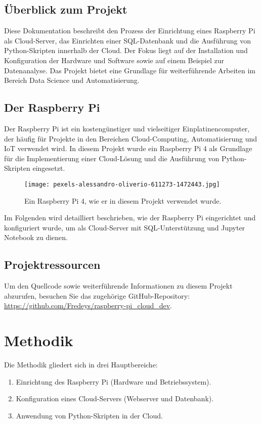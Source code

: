 \documentclass[a4paper,12pt]{article}
\begin{document}
\subsection{Überblick zum Projekt}
Diese Dokumentation beschreibt den Prozess der Einrichtung eines Raspberry Pi als Cloud-Server, das Einrichten einer SQL-Datenbank und die Ausführung von Python-Skripten innerhalb der Cloud. Der Fokus liegt auf der Installation und Konfiguration der Hardware und Software sowie auf einem Beispiel zur Datenanalyse. Das Projekt bietet eine Grundlage für weiterführende Arbeiten im Bereich Data Science und Automatisierung.

\subsection{Der Raspberry Pi}
Der Raspberry Pi ist ein kostengünstiger und vielseitiger Einplatinencomputer, der häufig für Projekte in den Bereichen Cloud-Computing, Automatisierung und IoT verwendet wird. In diesem Projekt wurde ein Raspberry Pi 4 als Grundlage für die Implementierung einer Cloud-Lösung und die Ausführung von Python-Skripten eingesetzt.

\begin{figure}[h!]
    \centering %
    \texttt{[image: pexels-alessandro-oliverio-611273-1472443.jpg]}
    \caption{Ein Raspberry Pi 4, wie er in diesem Projekt verwendet wurde.}
    \label{fig:raspberry_pi}
\end{figure}

\noindent
Im Folgenden wird detailliert beschrieben, wie der Raspberry Pi eingerichtet und konfiguriert wurde, um als Cloud-Server mit SQL-Unterstützung und Jupyter Notebook zu dienen.

\subsection{Projektressourcen}
Um den Quellcode sowie weiterführende Informationen zu diesem Projekt abzurufen, besuchen Sie das zugehörige GitHub-Repository:  
\url{https://github.com/Fredeys/raspberry-pi_cloud_dev}.


\section{Methodik}
Die Methodik gliedert sich in drei Hauptbereiche:
\begin{enumerate}
    \item Einrichtung des Raspberry Pi (Hardware und Betriebssystem).
    \item Konfiguration eines Cloud-Servers (Webserver und Datenbank).
    \item Anwendung von Python-Skripten in der Cloud.
\end{enumerate}
\end{document}

